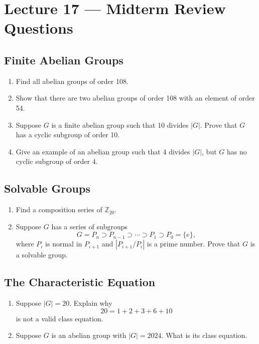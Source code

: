 \section{Lecture 17 — Midterm Review Questions}

\subsection*{\llap{\textcolor{main}{I.}\hspace{0.75em}}Finite Abelian Groups}

\begin{enumerate}[label=\textbf{\sffamily\color{main}\Alph*.}]
	\item Find all abelian groups of order 108.
	\item Show that there are two abelian groups of order 108 with an element of order 54.
	\item Suppose $G$ is a finite abelian group such that 10 divides $|G|$. Prove that $G$ has a cyclic subgroup of order 10.
	\item Give an example of an abelian group such that 4 divides $|G|$, but $G$ has no cyclic subgroup of order 4.
\end{enumerate}

\subsection*{\llap{\textcolor{main}{II.}\hspace{0.75em}}Solvable Groups}

\begin{enumerate}[label=\textbf{\sffamily\color{main}\Alph*.}]
	\item Find a composition series of $\mathbb Z_{20}$.
	\item Suppose $G$ has a series of subgroups
	$$G=P_n\supset P_{n-1}\supset\cdots\supset P_1\supset P_0=\{e\},$$
	where $P_i$ is normal in $P_{i+1}$ and $|P_{i+1}/P_i|$ is a prime number. Prove that $G$ is a solvable group.
\end{enumerate}

\subsection*{\llap{\textcolor{main}{III.}\hspace{0.75em}}The Characteristic Equation}

\begin{enumerate}[label=\textbf{\sffamily\color{main}\Alph*.}]
	\item Suppose $|G|=20$. Explain why
	$$20=1+2+3+6+10$$
	is not a valid class equation.
	\item Suppose $G$ is an abelian group with $|G|=2024$. What is its class equation.
\end{enumerate}

